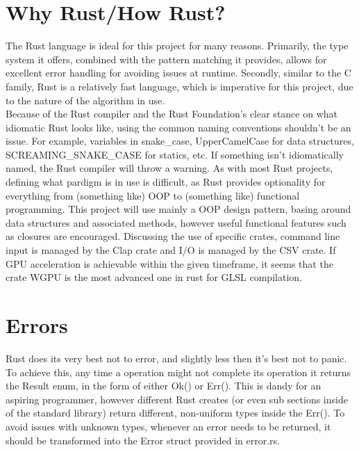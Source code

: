 \documentclass[11pt]{article}
\begin{document}
\section{Why Rust/How Rust?}
The Rust language is ideal for this project for many reasons. Primarily, the type system it offers, combined with the
pattern matching it provides, allows for excellent error handling for avoiding issues at runtime. Secondly, similar to the C family,
Rust is a relatively fast language, which is imperative for this project, due to the nature of the algorithm in use. \\
Because of the Rust compiler and the Rust Foundation's clear stance on what idiomatic Rust looks like, using the common naming conventions shouldn't be an issue.
For example, variables in snake\_case, UpperCamelCase for data structures, SCREAMING\_SNAKE\_CASE for statics, etc. If something isn't idiomatically named, the 
Rust compiler will throw a warning. As with most Rust projects, defining what pardigm is in use is difficult, as Rust provides optionality for everything 
from (something like) OOP to (something like) functional programming. This project will use mainly a OOP design pattern, basing around data 
structures and associated methods, however useful functional features such as closures are encouraged.
Discussing the use of specific crates, command line input is managed by the Clap crate and I/O is managed by the CSV crate. 
If GPU acceleration is achievable within the given timeframe, it seems that the crate WGPU is the most advanced one in rust for GLSL compilation. 
\section{Errors}
Rust does its very best not to error, and slightly less then it's best not to panic. To achieve this, any time a operation might not complete its 
operation it returns the Result enum, in the form of either Ok() or Err(). This is dandy for an aspiring programmer, however different Rust creates (or even sub sections inside
of the standard library) return different, non-uniform types inside the Err(). To avoid issues with unknown types, whenever an error needs to be returned, it should be transformed into the Error struct
provided in error.rs. 
\end{document}
